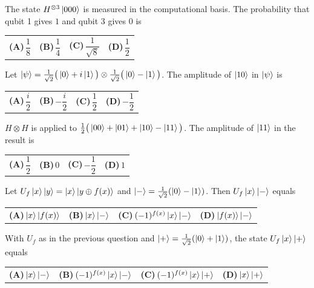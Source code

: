 \documentclass[11pt,a4paper]{article}
\newcommand{\optlabel}[1]{\textbf{(#1)}}
\newenvironment{qitem}[1]{\begin{list}{}{\setlength{\leftmargin}{3.3em}\setlength{\labelwidth}{3.1em}%
  \setlength{\labelsep}{0.2em}\setlength{\topsep}{3pt}\setlength{\parsep}{3pt}}\item[\textbf{Q.#1}\hfill]}{\end{list}}
\newcommand{\qsep}{\par\vspace{2pt}{\color{black!15}\hrule}\vspace{4pt}}
\begin{document}
\begin{qitem}{21}
The state $H^{\otimes3}\ket{000}$ is measured in the computational basis. The probability that qubit 1 gives $1$ and qubit 3 gives $0$ is
\par\smallskip\noindent\begin{tabularx}{\linewidth}{@{}*{4}{L}@{}}
\optlabel{A}\,$\dfrac18$ & \optlabel{B}\,$\dfrac14$ & \optlabel{C}\,$\dfrac{1}{\sqrt8}$ & \optlabel{D}\,$\dfrac12$
\end{tabularx}
\end{qitem}
\qsep

\begin{qitem}{22}
Let $\ket\psi = \frac{1}{\sqrt2}\big(\ket0 + i\ket1\big) \otimes \frac{1}{\sqrt2}\big(\ket0 - \ket1\big)$. The amplitude of $\ket{10}$ in $\ket\psi$ is
\par\smallskip\noindent\begin{tabularx}{\linewidth}{@{}*{4}{L}@{}}
\optlabel{A}\,$\dfrac{i}{2}$ & \optlabel{B}\,$-\dfrac{i}{2}$ & \optlabel{C}\,$\dfrac12$ & \optlabel{D}\,$-\dfrac12$
\end{tabularx}
\end{qitem}
\qsep

\begin{qitem}{23}
$H \otimes H$ is applied to $\frac12\big(\ket{00} + \ket{01} + \ket{10} - \ket{11}\big)$. The amplitude of $\ket{11}$ in the result is
\par\smallskip\noindent\begin{tabularx}{\linewidth}{@{}*{4}{L}@{}}
\optlabel{A}\,$\dfrac12$ & \optlabel{B}\,$0$ & \optlabel{C}\,$-\dfrac12$ & \optlabel{D}\,$1$
\end{tabularx}
\end{qitem}
\qsep

\begin{qitem}{24}
Let $U_f\ket{x}\ket{y} = \ket{x}\ket{y \oplus f(x)}$ and $\ket{-} = \frac{1}{\sqrt2}(\ket0 - \ket1)$. Then $U_f\ket{x}\ket{-}$ equals
\par\smallskip\noindent\begin{tabularx}{\linewidth}{@{}*{4}{L}@{}}
\optlabel{A}\,$\ket{x}\ket{f(x)}$ & \optlabel{B}\,$\ket{x}\ket{-}$ & \optlabel{C}\,$(-1)^{f(x)}\ket{x}\ket{-}$ & \optlabel{D}\,$\ket{f(x)}\ket{-}$
\end{tabularx}
\end{qitem}
\qsep

\begin{qitem}{25}
With $U_f$ as in the previous question and $\ket{+} = \frac{1}{\sqrt2}(\ket0 + \ket1)$, the state $U_f\ket{x}\ket{+}$ equals
\par\smallskip\noindent\begin{tabularx}{\linewidth}{@{}*{4}{L}@{}}
\optlabel{A}\,$\ket{x}\ket{-}$ & \optlabel{B}\,$(-1)^{f(x)}\ket{x}\ket{-}$ & \optlabel{C}\,$(-1)^{f(x)}\ket{x}\ket{+}$ & \optlabel{D}\,$\ket{x}\ket{+}$
\end{tabularx}
\end{qitem}
\qsep
\end{document}
